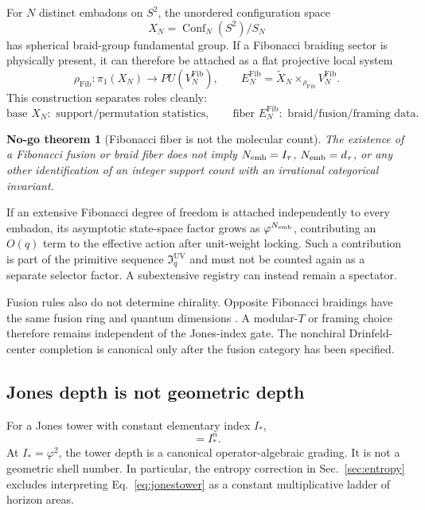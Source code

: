 \documentclass[aps,prd,preprint,nofootinbib,superscriptaddress]{revtex4-2}
\newtheorem{nogotheorem}[theorem]{No-go theorem}
\theoremstyle{definition}
\theoremstyle{remark}
\newcommand{\UV}{\mathrm{UV}}
\newcommand{\cI}{\mathfrak I}
\newcommand{\Conf}{\operatorname{Conf}}
\newcommand{\Fib}{\mathrm{Fib}}
\begin{document}
For $N$ distinct embadons on $S^2$, the unordered configuration space
\begin{equation}
X_N=\Conf_N(S^2)/S_N
\label{eq:fibconfig}
\end{equation}
has spherical braid-group fundamental group.  If a Fibonacci braiding sector
is physically present, it can therefore be attached as a flat projective
local system
\begin{equation}
\rho_{\Fib}:\pi_1(X_N)\longrightarrow PU(V_N^{\Fib}),
\qquad
E_N^{\Fib}
=
\widetilde X_N\times_{\rho_{\Fib}}V_N^{\Fib}.
\label{eq:fiblocalsystem}
\end{equation}
This construction separates roles cleanly:
\begin{equation}
\boxed{
\text{base }X_N:
\text{ support/permutation statistics},
\qquad
\text{fiber }E_N^{\Fib}:
\text{ braid/fusion/framing data}.
}
\label{eq:basefiberroles}
\end{equation}

\begin{nogotheorem}[Fibonacci fiber is not the molecular count]
\label{thm:fibcountnogo}
The existence of a Fibonacci fusion or braid fiber does not imply
$N_{\rm emb}=I_\tau$, $N_{\rm emb}=d_\tau$, or any other identification of an
integer support count with an irrational categorical invariant.
\end{nogotheorem}

If an extensive Fibonacci degree of freedom is attached independently to
every embadon, its asymptotic state-space factor grows as
$\varphi^{N_{\rm emb}}$, contributing an $O(q)$ term to the effective action
after unit-weight locking.  Such a contribution is part of the primitive
sequence $\cI_q^{\UV}$ and must not be counted again as a separate selector
factor.  A subextensive registry can instead remain a spectator.

Fusion rules also do not determine chirality.  Opposite Fibonacci braidings
have the same fusion ring and quantum dimensions \cite{EdieMichell2021}.  A modular-$T$ or framing
choice therefore remains independent of the Jones-index gate.  The nonchiral
Drinfeld-center completion is canonical only after the fusion category has
been specified.

\subsection{Jones depth is not geometric depth}

For a Jones tower with constant elementary index $I_*$,
\begin{equation}
[M_n:M_0]=I_*^n.
\label{eq:jonestower}
\end{equation}
At $I_*=\varphi^2$, the tower depth is a canonical operator-algebraic grading.
It is not a geometric shell number.  In particular, the entropy correction in
Sec.~\ref{sec:entropy} excludes interpreting Eq.~\eqref{eq:jonestower} as a
constant multiplicative ladder of horizon areas.
\end{document}
